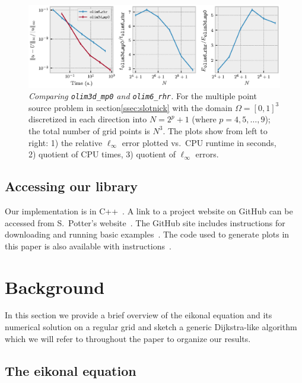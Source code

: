 \documentclass[smallcondensed]{svjour3}
\begin{document}
\begin{figure}
  \centering
  \includegraphics[width=\linewidth]{intro.eps}
  \caption{\emph{Comparing \texttt{olim3d\_mp0} and
      \texttt{olim6\_rhr}.} For the multiple point source problem in
    section\@ \ref{ssec:slotnick} with the domain $\Omega = [0, 1]^3$
    discretized in each direction into $N = 2^p + 1$ (where
    $p = 4, 5, \hdots, 9$); the total number of grid points is
    $N^3$. The plots show from left to right: 1) the relative
    $\ell_\infty$ error plotted vs.\ CPU runtime in seconds, 2)
    quotient of CPU times, 3) quotient of $\ell_\infty$
    errors.}\label{fig:intro}
\end{figure}

\subsection{Accessing our library} Our implementation is in
C++~\cite{stroustrup2013c++}. A link to a project website on GitHub
can be accessed from S.\ Potter's
website~\cite{sfp-umiacs-homepage}. The GitHub site includes
instructions for downloading and running basic
examples~\cite{libolim-github}. The code used to generate plots in
this paper is also available with
instructions~\cite{libolim-github-plotting}.

\section{Background}\label{sec:background}

In this section we provide a brief overview of the eikonal equation
and its numerical solution on a regular grid and sketch a generic
Dijkstra-like algorithm which we will refer to throughout the paper to
organize our results.

\subsection{The eikonal equation}
\end{document}
